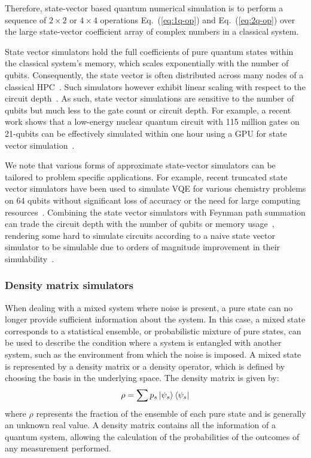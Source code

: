 Therefore, state-vector based quantum numerical simulation is to perform a sequence of $2\times2$ or $4\times4$ operations Eq.~(\ref{eq:1q-op}) and Eq.~(\ref{eq:2q-op}) over the large state-vector coefficient array of complex numbers in a classical system.

State vector simulators hold the full coefficients of pure quantum states within the classical system's memory, which scales exponentially with the number of qubits. Consequently, the state vector is often distributed across many nodes of a classical HPC~\cite{haner20170,pednault2017breaking,pednault2019leveraging,li2021sv}. Such simulators however exhibit linear scaling with respect to the circuit depth~\cite{fatima2021faster}. As such, state vector simulations are sensitive to the number of qubits but much less to the gate count or circuit depth. For example, a recent work shows that a low-energy nuclear quantum circuit with 115 million gates on 21-qubits can be effectively simulated within one hour using a GPU for state vector simulation~\cite{li2023deep}.

We note that various forms of approximate state-vector simulators can be tailored to problem specific applications.  For example, recent truncated state vector simulators have been used to simulate VQE for various chemistry problems on 64 qubits without significant loss of accuracy or the need for large computing resources~\cite{preopt-2,approxstatevec}. Combining the state vector simulators with Feynman path summation can trade the circuit depth with the number of qubits or memory usage~\cite{fatima2021faster}, rendering some hard to simulate circuits according to a naive state vector simulator to be simulable due to orders of magnitude improvement in their simulability~\cite{markov2020massively,fatima2021faster}.

\subsubsection{Density matrix simulators}

When dealing with a mixed system where noise is present, a pure state can no longer provide sufficient information about the system. In this case, a mixed state corresponds to a statistical ensemble, or probabilistic mixture of pure states, can be used to describe the condition where a system is entangled with another system, such as the environment from which the noise is imposed. A mixed state is represented by a density matrix or a density operator, which is defined by choosing the basis in the underlying space. The density matrix is given by:
\begin{equation*}
\rho=\sum{p_s\ket{\psi_s}\bra{\psi_s}}
\end{equation*}
where $\rho$ represents the fraction of the ensemble of each pure state and is generally an unknown real value. A density matrix contains all the information of a quantum system, allowing the calculation of the probabilities of the outcomes of any measurement performed.

